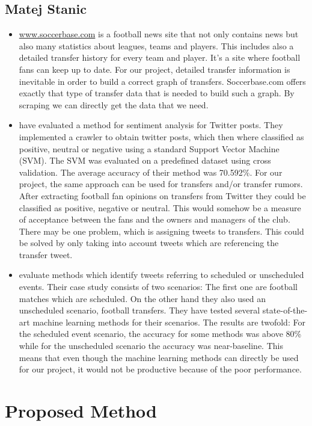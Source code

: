 \documentclass{article}
\begin{document}
\subsection{Matej Stanic}
\begin{itemize}
	\item \url{www.soccerbase.com} is a football news site that not only contains news but also many statistics about leagues, teams and players. This includes also a detailed transfer history for every team and player. It's a site where football fans can keep up to date. For our project, detailed transfer information is inevitable in order to build a correct graph of transfers. Soccerbase.com offers exactly that type of transfer data that is needed to build such a graph. By scraping we can directly get the data that we need.
	\item \cite{Shrivatava2014} have evaluated a method for sentiment analysis for Twitter posts. They implemented a crawler to obtain twitter posts, which then where classified as positive, neutral or negative using a standard Support Vector Machine (SVM). The SVM was evaluated on a predefined dataset using cross validation. The average accuracy of their method was 70.592\%. For our project, the same approach can be used for transfers and/or transfer rumors. After extracting football fan opinions on transfers from Twitter they could be classified as positive, negative or neutral. This would somehow be a measure of acceptance between the fans and the owners and managers of the club. There may be one problem, which is assigning tweets to transfers. This could be solved by only taking into account tweets which are referencing the transfer tweet.
	\item \cite{Kunneman+12} evaluate methods which identify tweets referring to scheduled or unscheduled events. Their case study consists of two scenarios: The first one are football matches which are scheduled. On the other hand they also used an unscheduled scenario, football transfers. They have tested several state-of-the-art machine learning methods for their scenarios. The results are twofold: For the scheduled event scenario, the accuracy for some methods was above 80\% while for the unscheduled scenario the accuracy was near-baseline. This means that even though the machine learning methods can directly be used for our project, it would not be productive because of the poor performance. 
\end{itemize}
\section{Proposed Method}
\end{document}
